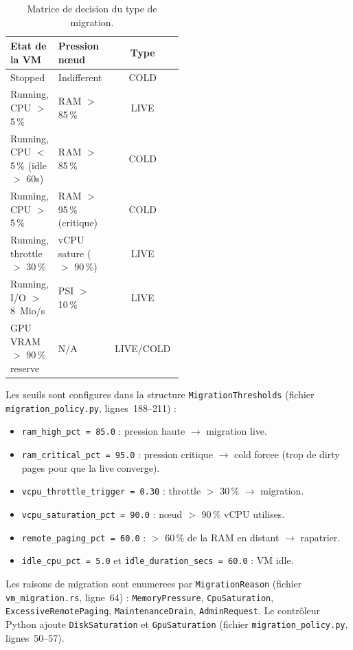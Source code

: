 \begin{table}[htbp]
    \centering
    \caption{Matrice de decision du type de migration.}
    \label{tab:migration-matrice}
    \begin{tabular}{p{0.25\linewidth} p{0.25\linewidth} c}
        \toprule
        \textbf{Etat de la VM} & \textbf{Pression nœud} & \textbf{Type} \\
        \midrule
        Stopped & Indifferent & COLD \\
        Running, CPU $>$ 5\,\% & RAM $>$ 85\,\% & LIVE \\
        Running, CPU $<$ 5\,\% (idle $>$ 60s) & RAM $>$ 85\,\% & COLD \\
        Running, CPU $>$ 5\,\% & RAM $>$ 95\,\% (critique) & COLD \\
        Running, throttle $>$ 30\,\% & vCPU sature ($>$ 90\,\%) & LIVE \\
        Running, I/O $>$ 8~Mio/s & PSI $>$ 10\,\% & LIVE \\
        GPU VRAM $>$ 90\,\% reserve & N/A & LIVE/COLD \\
        \bottomrule
    \end{tabular}
\end{table}

Les seuils sont configures dans la structure \texttt{MigrationThresholds} (fichier \texttt{migration\_policy.py}, lignes~188--211) :

\begin{itemize}
    \item \texttt{ram\_high\_pct = 85.0} : pression haute $\to$ migration live.
    \item \texttt{ram\_critical\_pct = 95.0} : pression critique $\to$ cold forcee (trop de dirty pages pour que la live converge).
    \item \texttt{vcpu\_throttle\_trigger = 0.30} : throttle $>$ 30\,\% $\to$ migration.
    \item \texttt{vcpu\_saturation\_pct = 90.0} : nœud $>$ 90\,\% vCPU utilises.
    \item \texttt{remote\_paging\_pct = 60.0} : $>$ 60\,\% de la RAM en distant $\to$ rapatrier.
    \item \texttt{idle\_cpu\_pct = 5.0} et \texttt{idle\_duration\_secs = 60.0} : VM idle.
\end{itemize}

Les raisons de migration sont enumerees par \texttt{MigrationReason} (fichier \texttt{vm\_migration.rs}, ligne~64) : \texttt{MemoryPressure}, \texttt{CpuSaturation}, \texttt{ExcessiveRemotePaging}, \texttt{MaintenanceDrain}, \texttt{AdminRequest}. Le contrôleur Python ajoute \texttt{DiskSaturation} et \texttt{GpuSaturation} (fichier \texttt{migration\_policy.py}, lignes~50--57).

